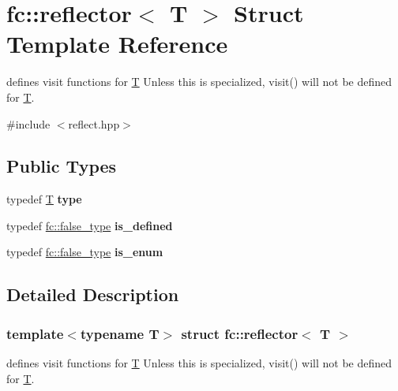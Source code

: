 \hypertarget{structfc_1_1reflector}{}\section{fc\+:\+:reflector$<$ T $>$ Struct Template Reference}
\label{structfc_1_1reflector}


defines visit functions for \mbox{\hyperlink{struct_t}{T}} Unless this is specialized, visit() will not be defined for \mbox{\hyperlink{struct_t}{T}}.  




{\ttfamily \#include $<$reflect.\+hpp$>$}

\subsection*{Public Types}
\begin{DoxyCompactItemize}
\item 
\mbox{\label{structfc_1_1reflector_a5ce7f9fd0c0e55be9c7772905767c0c7}} 
typedef \mbox{\hyperlink{struct_t}{T}} {\bfseries type}
\item 
\mbox{\label{structfc_1_1reflector_a74a263b2a7a6bf35f8ca1908bd4b1efd}} 
typedef \mbox{\hyperlink{structfc_1_1false__type}{fc\+::false\+\_\+type}} {\bfseries is\+\_\+defined}
\item 
\mbox{\label{structfc_1_1reflector_a927cf80dea1abd5b474cb889c7c002a4}} 
typedef \mbox{\hyperlink{structfc_1_1false__type}{fc\+::false\+\_\+type}} {\bfseries is\+\_\+enum}
\end{DoxyCompactItemize}


\subsection{Detailed Description}
\subsubsection*{template$<$typename T$>$\newline
struct fc\+::reflector$<$ T $>$}

defines visit functions for \mbox{\hyperlink{struct_t}{T}} Unless this is specialized, visit() will not be defined for \mbox{\hyperlink{struct_t}{T}}. 


